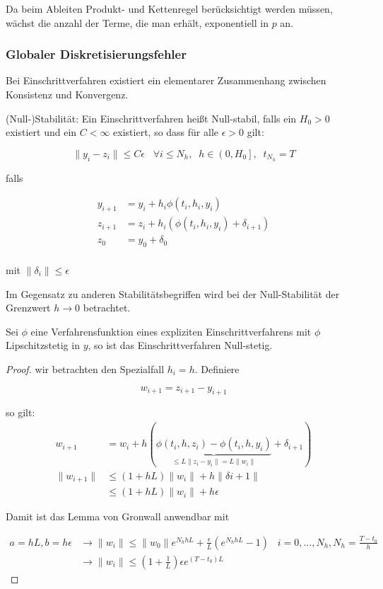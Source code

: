 Da beim Ableiten Produkt- und Kettenregel berücksichtigt werden müssen, wächst die anzahl der Terme, die man erhält, exponentiell in $p$ an.

\subsubsection{Globaler Diskretisierungsfehler}

Bei Einschrittverfahren existiert ein elementarer Zusammenhang zwischen Konsistenz und Konvergenz.

\begin{definition}[Definition IV.5] (Null-)Stabilität: Ein Einschrittverfahren heißt Null-stabil, falls ein $H_0 > 0$ existiert und ein $C < \infty$ existiert, so dass für alle $\epsilon > 0$ gilt:

	$$\|y_i - z_i\| \le C \epsilon \;\;\;\forall i \le N_h,\;\;h \in \left(0,H_0\right],\;\;t_{N_h} = T$$

	falls
	
	\begin{align*}
		y_{i+1} &= y_i + h_i \phi (t_i, h_i, y_i) \\
		z_{i+1} &= z_i + h_i (\phi (t_i, h_i, y_i) + \delta_{i+1}) \\
		z_0 &= y_0 + \delta_0 \\
	\end{align*}
	
	mit $\|\delta_i\| \le \epsilon$

\end{definition}


Im Gegensatz zu anderen Stabilitätsbegriffen wird bei der Null-Stabilität der Grenzwert $h \to 0$ betrachtet.

\begin{theorem}
	Sei $\phi$ eine Verfahrensfunktion eines expliziten Einschrittverfahrens mit $\phi$ Lipschitzstetig in $y$, so ist das Einschrittverfahren Null-stetig.
\end{theorem}

\begin{proof} wir betrachten den Spezialfall $h_i = h$. Definiere

	$$w_{i+1} = z_{i+1} - y_{i+1}$$

	so gilt:
	\begin{align*}
		w_{i+1} &= w_i + h(\underbrace{\phi(t_i, h, z_i) - \phi(t_i, h, y_i)}_{\le L \|z_i - y_i\| = L \|w_i\|} + \delta_{i+1})\\
		\|w_{i+1}\| &\le (1 + hL) \|w_i\| + h\|\delta{i+1}\| \\
		& \le (1+hL)\|w_i\| + h\epsilon
	\end{align*}
	
	Damit ist das Lemma von Gronwall anwendbar mit 
	
	\begin{align*}
		a = hL, b = h\epsilon &\rightarrow \|w_i\| \le \|w_0\| e^{N_h hL} + \frac{\epsilon}{L}\left(e^{N_h hL} - 1\right) \;\;\; i = 0, \dots, N_h, N_h = \frac{T - t_0}{h}\\
		&\rightarrow \|w_i\| \le \left(1 + \frac{1}{L}\right) \epsilon e^{(T-t_0)L}
	\end{align*}
\end{proof}

